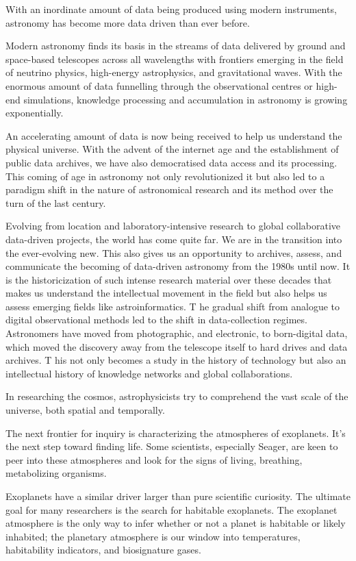 With an inordinate amount of data being produced using modern instruments, astronomy has become more data driven than ever before.


Modern astronomy finds its basis in the streams of data delivered by ground and space-based telescopes across all wavelengths with frontiers emerging in the field of neutrino physics, high-energy astrophysics, and gravitational waves.
With the enormous amount of data funnelling through the observational centres or high-end simulations, knowledge processing and accumulation in astronomy is growing exponentially.


An accelerating amount of data is now being received to help us understand the physical universe. With the advent of the internet age and the establishment of public data archives, we have also democratised data access and its processing. This coming of age in astronomy not only revolutionized it but also led to a paradigm shift in the nature of astronomical research and its method over the turn of the last century.



Evolving from location and laboratory-intensive research to global collaborative data-driven projects, the world has come quite far.  We are in the transition into the ever-evolving new. This also gives us an opportunity to archives, assess, and communicate the becoming of data-driven astronomy from the 1980s until now. It is the historicization of such intense research material over these decades that makes us understand the intellectual movement in the field but also helps us assess emerging fields like astroinformatics.  T
he gradual shift from analogue to digital observational methods led to the shift in data-collection regimes.
Astronomers have moved from photographic, and electronic, to born-digital data, which moved the discovery away from the telescope itself to hard drives and data archives. T
his not only becomes a study in the history of technology but also an intellectual history of knowledge networks and global collaborations.


In researching the cosmos, astrophysicists try to comprehend the vast scale of the universe, both spatial and temporally.


The next frontier for inquiry is characterizing the atmospheres of exoplanets. It's the next step toward finding life. Some scientists, especially Seager, are keen to peer into these atmospheres and look for the signs of living, breathing, metabolizing organisms.

Exoplanets have a similar driver larger than pure scientific curiosity. The ultimate goal
for many researchers is the search for habitable exoplanets. The exoplanet atmosphere
is the only way to infer whether or not a planet is habitable or likely inhabited; the
planetary atmosphere is our window into temperatures, habitability indicators, and
biosignature gases.

